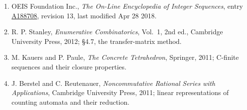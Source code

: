 \documentclass[11pt]{article}
\theoremstyle{definition}
\begin{document}
\begin{enumerate}

\item OEIS Foundation Inc., \emph{The On-Line Encyclopedia of Integer Sequences}, entry \href{https://oeis.org/A188708}{A188708}, revision 13, last modified Apr 28 2018.

\item R. P. Stanley, \emph{Enumerative Combinatorics}, Vol.~1, 2nd ed., Cambridge University Press, 2012; \S4.7, the transfer-matrix method.

\item M. Kauers and P. Paule, \emph{The Concrete Tetrahedron}, Springer, 2011; C-finite sequences and their closure properties.

\item J. Berstel and C. Reutenauer, \emph{Noncommutative Rational Series with Applications}, Cambridge University Press, 2011; linear representations of counting automata and their reduction.

\end{enumerate}
\end{document}
